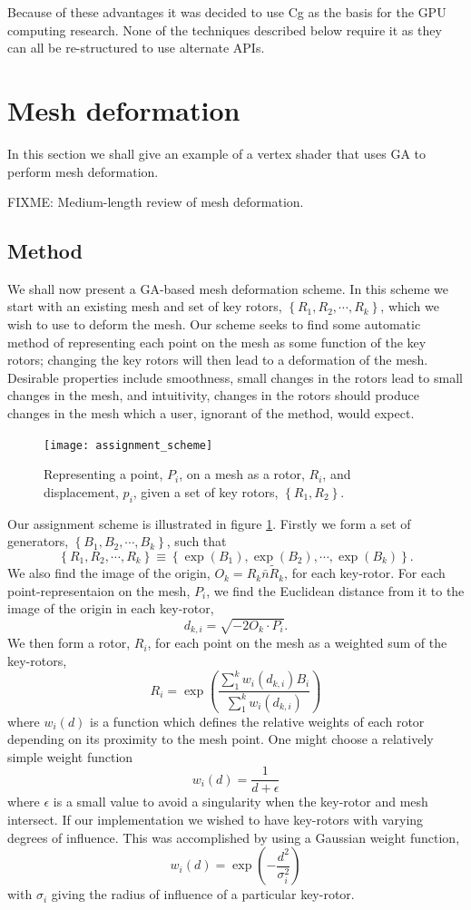 Because of these advantages it was decided to use Cg as the basis for the GPU
computing research. None of the techniques described below require it as they
can all be re-structured to use alternate APIs.

\section{Mesh deformation}

In this section we shall give an example of a vertex shader that uses GA to
perform mesh deformation.

FIXME: Medium-length review of mesh deformation.

\subsection{Method}

We shall now present a GA-based mesh deformation scheme. In this scheme we start with
an existing mesh and set of key rotors, $\left\{ R_1, R_2, \cdots, R_k \right\}$,
which we wish to use to deform the mesh. Our scheme seeks to find some automatic
method of representing each point on the mesh as some function of the key
rotors; changing the key rotors will then lead to a deformation of the mesh. Desirable
properties include smoothness, small changes in the rotors lead to small changes
in the mesh, and intuitivity, changes in the rotors should produce changes
in the mesh which a user, ignorant of the method, would expect.

\begin{figure}
\centering
\texttt{[image: assignment\_scheme]}
\caption{\label{fig:assignment_scheme}Representing a point, $P_i$, on a mesh as
a rotor, $R_i$, and displacement, $p_i$, given a set of key rotors, 
  $\left\{R_1, R_2\right\}$.}
\end{figure}

Our assignment scheme is illustrated in figure \ref{fig:assignment_scheme}.
Firstly we form a set of generators, $\left\{B_1, B_2, \cdots, B_k\right\}$,
such that
\[
\left\{ R_1, R_2, \cdots, R_k \right\} \equiv \left\{\exp(B_1), \exp(B_2),
        \cdots, \exp(B_k)\right\}.
\]
We also find the image of the origin, $O_k = R_k\bar{n}\tilde{R}_k$, for 
each key-rotor. For each point-representaion on the mesh, $P_i$, we find the Euclidean
distance from it to the image of the origin in each key-rotor,
\[
\label{eqn:dki}
d_{k,i} = \sqrt{-2O_k \cdot P_i}.
\]
We then form a rotor, $R_i$, for each point on the mesh as a weighted sum of the
key-rotors,
\[
R_i = \exp\left(\frac{\sum^{k}_1 w_i(d_{k,i}) B_i}{\sum^{k}_1 w_i(d_{k,i})}\right)
\]
where $w_i(d)$ is a function which defines the relative weights of each rotor depending
on its proximity to the mesh point. One might choose a relatively simple weight function
\[
w_i(d) = \frac{1}{d + \epsilon}
\]
where $\epsilon$ is a small value to avoid a singularity when the key-rotor and mesh
intersect. If our implementation we wished to have key-rotors with varying degrees of influence.
This was accomplished by using a Gaussian weight function,
\[
w_i(d) = \exp\left(-\frac{d^2}{\sigma_i^2}\right)
\]
with $\sigma_i$ giving the radius of influence of a particular key-rotor.

